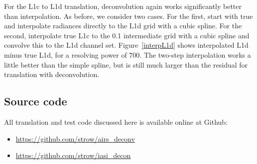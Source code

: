 \documentclass[10pt,twocolumn]{article}
\begin{document}
For the {\airs} L1c to L1d translation, deconvolution again works
significantly better than interpolation.  As before, we consider two
cases.  For the first, start with true {\airs} and interpolate
radiances directly to the L1d grid with a cubic spline.  For the
second, interpolate true L1c to the 0.1 {\wn} intermediate grid with
a cubic spline and convolve this to the L1d channel set.
Figure~\ref{interpL1d} shows interpolated L1d minus true L1d, for a
resolving power of 700.  The two-step interpolation works a little
better than the simple spline, but is still much larger than the
residual for translation with deconvolution.

\subsection{Source code}


All translation and test code discussed here is available online at
Github:

\begin{itemize}
   \item \url{https://github.com/strow/airs_deconv}\vspace{-3mm}
   \item \url{https://github.com/strow/iasi_decon}
\end{itemize}



\end{document}
